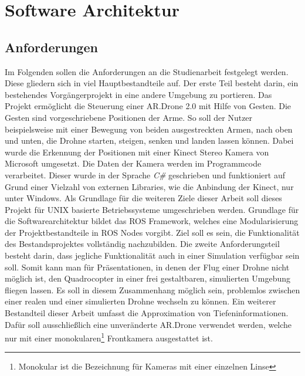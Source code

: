 
\chapter{Software Architektur}
\section{Anforderungen}
\label{sec:Anforderungen} 

Im Folgenden sollen die Anforderungen an die Studienarbeit festgelegt werden. Diese gliedern sich in viel Hauptbestandteile auf. \newline
Der erste Teil besteht darin, ein bestehendes Vorgängerprojekt in eine andere Umgebung zu portieren. Das Projekt ermöglicht die Steuerung einer AR.Drone 2.0 mit Hilfe von Gesten. Die Gesten sind vorgeschriebene Positionen der Arme. So soll der Nutzer beispielsweise mit einer Bewegung von beiden ausgestreckten Armen, nach oben und unten, die Drohne starten, steigen, senken und landen lassen können. \newline
Dabei wurde die Erkennung der Positionen mit einer Kinect Stereo Kamera von Microsoft umgesetzt. Die Daten der Kamera werden im Programmcode verarbeitet. Dieser wurde in der Sprache \textit{C\#} geschrieben und funktioniert auf Grund einer Vielzahl von externen Libraries, wie die Anbindung der Kinect, nur unter Windows. \newline
Als Grundlage für die weiteren Ziele dieser Arbeit soll dieses Projekt für UNIX basierte Betriebssysteme umgeschrieben werden. Grundlage für die Softwarearchitektur bildet das ROS Framework, welches eine Modularisierung der Projektbestandteile in ROS Nodes vorgibt. Ziel soll es sein, die Funktionalität des Bestandsprojektes vollständig nachzubilden. \newline
Die zweite Anforderungsteil besteht darin, dass jegliche Funktionalität auch in einer Simulation verfügbar sein soll. Somit kann man für Präsentationen, in denen der Flug einer Drohne nicht möglich ist, den Quadrocopter in einer frei gestaltbaren, simulierten Umgebung fliegen lassen. \newline
Es soll in diesem Zusammenhang möglich sein, problemlos zwischen einer realen und einer simulierten Drohne wechseln zu können.
Ein weiterer Bestandteil dieser Arbeit umfasst die Approximation von Tiefeninformationen. Dafür soll ausschließlich eine unveränderte AR.Drone verwendet werden, welche nur mit einer monokularen\footnote{Monokular ist die Bezeichnung für Kameras mit einer einzelnen Linse} Frontkamera ausgestattet ist. \newline
